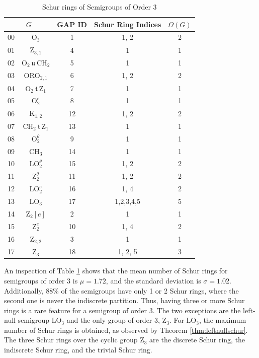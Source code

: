 \documentclass{article}
\theoremstyle{plain}
\theoremstyle{definition}
\renewcommand{\O}{\mathrm{O}}
\newcommand{\K}{\mathrm{K}}
\newcommand{\LO}{\mathrm{LO}}
\newcommand{\ORO}{\mathrm{ORO}}
\newcommand{\CH}{\mathrm{CH}}
\newcommand{\z}{\mathrm{Z}}
\renewcommand{\t}{\ \mathfrak{t}\ }
\renewcommand{\u}{\ \mathfrak{u}\ }
\begin{document}
\begin{table}[ht]
\begin{center}
\begin{tabular}{ccc|c|c}
\multicolumn{2}{c}{$G$} & GAP ID & Schur Ring Indices & $\Omega(G)$\\
\hline
00 & $\O_3$ & 1 & 1, 2 & 2\\
01 & $\z_{3,1}$ & 4 & 1 & 1\\
02 & $\O_2 \u \CH_2$ & 5 & 1 & 1\\
03 & $\ORO_{2,1}$ & 6 & 1, 2 & 2\\
04 & $\O_2 \t \z_1$ & 7 & 1 & 1\\
05 & $\O_2^e$ & 8 & 1 & 1\\
06 & $\K_{1,2}$ & 12 & 1, 2 & 2\\
07 & $\CH_2\t\z_1$ & 13 & 1 & 1\\
08 & $\O_2^\theta$ & 9 & 1 & 1\\
09 & $\CH_3$ & 14 & 1 & 1\\
10 & $\LO_2^\theta$ & 15 & 1, 2 & 2\\ 
11 & $\z_2^\theta$ & 11 & 1, 2 & 2\\
12 & $\LO_2^e$ & 16 & 1, 4 & 2\\
13 & $\LO_3$ & 17 & 1,2,3,4,5 & 5\\
14 & $\z_2[e]$& 2 & 1 & 1\\
15 & $\z_2^e$ & 10 & 1, 4 & 2\\
16 & $\z_{2,2}$ & 3 & 1 & 1\\
17 & $\z_3$ & 18 & 1, 2, 5 & 3\\
\end{tabular}
\end{center}
\caption{Schur rings of Semigroups of Order $3$}
\label{fig:sgsr3}
\end{table}

An inspection of Table \ref{fig:sgsr3} shows that the mean number of Schur rings for semigroups of order $3$ is $\mu = 1.72$, and the standard deviation is $\sigma=1.02$. Additionally, 88\% of the semigroups have only 1 or 2 Schur rings, where the second one is never the indiscrete partition. Thus, having three or more Schur rings is a rare feature for a semigroup of order $3$. The two exceptions are the left-null semigroup $\LO_3$ and the only group of order $3$, $\z_3$. For $\LO_3$, the maximum number of Schur rings is obtained, as observed by Theorem \ref{thm:leftnullschur}. The three Schur rings over the cyclic group $\z_3$ are the discrete Schur ring, the indiscrete Schur ring, and the trivial Schur ring. 
\end{document}
